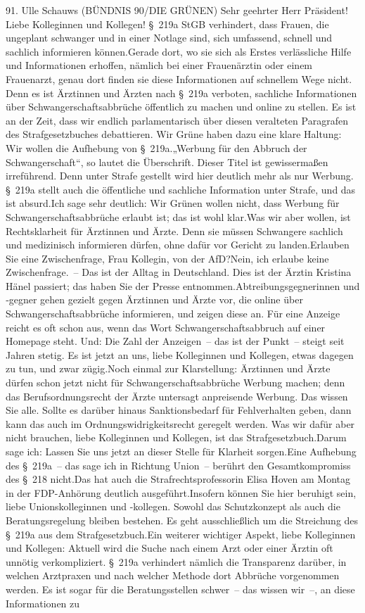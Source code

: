 \documentclass{article}
\begin{document}
	91. Ulle Schauws (BÜNDNIS 90/DIE GRÜNEN) Sehr geehrter Herr Präsident! Liebe Kolleginnen und Kollegen! § 219a StGB verhindert, dass Frauen, die ungeplant schwanger und in einer Notlage sind, sich umfassend, schnell und sachlich informieren können.Gerade dort, wo sie sich als Erstes verlässliche Hilfe und Informationen erhoffen, nämlich bei einer Frauenärztin oder einem Frauenarzt, genau dort finden sie diese Informationen auf schnellem Wege nicht. Denn es ist Ärztinnen und Ärzten nach § 219a verboten, sachliche Informationen über Schwangerschaftsabbrüche öffentlich zu machen und online zu stellen. Es ist an der Zeit, dass wir endlich parlamentarisch über diesen veralteten Paragrafen des Strafgesetzbuches debattieren. Wir Grüne haben dazu eine klare Haltung: Wir wollen die Aufhebung von § 219a.„Werbung für den Abbruch der Schwangerschaft“, so lautet die Überschrift. Dieser Titel ist gewissermaßen irreführend. Denn unter Strafe gestellt wird hier deutlich mehr als nur Werbung. § 219a stellt auch die öffentliche und sachliche Information unter Strafe, und das ist absurd.Ich sage sehr deutlich: Wir Grünen wollen nicht, dass Werbung für Schwangerschaftsabbrüche erlaubt ist; das ist wohl klar.Was wir aber wollen, ist Rechtsklarheit für Ärztinnen und Ärzte. Denn sie müssen Schwangere sachlich und medizinisch informieren dürfen, ohne dafür vor Gericht zu landen.Erlauben Sie eine Zwischenfrage, Frau Kollegin, von der AfD?Nein, ich erlaube keine Zwischenfrage. – Das ist der Alltag in Deutschland. Dies ist der Ärztin Kristina Hänel passiert; das haben Sie der Presse entnommen.Abtreibungsgegnerinnen und ‑gegner gehen gezielt gegen Ärztinnen und Ärzte vor, die online über Schwangerschaftsabbrüche informieren, und zeigen diese an. Für eine Anzeige reicht es oft schon aus, wenn das Wort Schwangerschaftsabbruch auf einer Homepage steht. Und: Die Zahl der Anzeigen – das ist der Punkt – steigt seit Jahren stetig. Es ist jetzt an uns, liebe Kolleginnen und Kollegen, etwas dagegen zu tun, und zwar zügig.Noch einmal zur Klarstellung: Ärztinnen und Ärzte dürfen schon jetzt nicht für Schwangerschaftsabbrüche Werbung machen; denn das Berufsordnungsrecht der Ärzte untersagt anpreisende Werbung. Das wissen Sie alle. Sollte es darüber hinaus Sanktionsbedarf für Fehlverhalten geben, dann kann das auch im Ordnungswidrigkeitsrecht geregelt werden. Was wir dafür aber nicht brauchen, liebe Kolleginnen und Kollegen, ist das Strafgesetzbuch.Darum sage ich: Lassen Sie uns jetzt an dieser Stelle für Klarheit sorgen.Eine Aufhebung des § 219a – das sage ich in Richtung Union – berührt den Gesamtkompromiss des § 218 nicht.Das hat auch die Strafrechtsprofessorin Elisa Hoven am Montag in der FDP-Anhörung deutlich ausgeführt.Insofern können Sie hier beruhigt sein, liebe Unionskolleginnen und -kollegen. Sowohl das Schutzkonzept als auch die Beratungsregelung bleiben bestehen. Es geht ausschließlich um die Streichung des § 219a aus dem Strafgesetzbuch.Ein weiterer wichtiger Aspekt, liebe Kolleginnen und Kollegen: Aktuell wird die Suche nach einem Arzt oder einer Ärztin oft unnötig verkompliziert. § 219a verhindert nämlich die Transparenz darüber, in welchen Arztpraxen und nach welcher Methode dort Abbrüche vorgenommen werden. Es ist sogar für die Beratungsstellen schwer – das wissen wir –, an diese Informationen zu 
\end{document}
